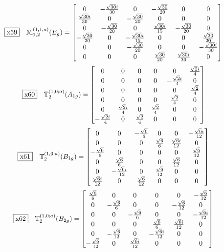 \documentclass[fleqn,10pt,landscape]{jsarticle}
\begin{document}
\begin{dmath*}
\fbox{x59}\quad \mathbb{M}_{1,2}^{(1,1;a)}(E_{g})=\begin{bmatrix} 0 & - \frac{\sqrt{30} i}{30} & 0 & - \frac{\sqrt{30}}{20} & 0 & 0 \\ \frac{\sqrt{30} i}{30} & 0 & - \frac{\sqrt{30}}{20} & 0 & 0 & 0 \\ 0 & - \frac{\sqrt{30}}{20} & 0 & \frac{\sqrt{30} i}{15} & - \frac{\sqrt{30}}{20} & 0 \\ - \frac{\sqrt{30}}{20} & 0 & - \frac{\sqrt{30} i}{15} & 0 & 0 & \frac{\sqrt{30}}{20} \\ 0 & 0 & - \frac{\sqrt{30}}{20} & 0 & 0 & - \frac{\sqrt{30} i}{30} \\ 0 & 0 & 0 & \frac{\sqrt{30}}{20} & \frac{\sqrt{30} i}{30} & 0 \end{bmatrix}
\end{dmath*}
\begin{dmath*}
\fbox{x60}\quad \mathbb{T}_{2}^{(1,0;a)}(A_{1g})=\begin{bmatrix} 0 & 0 & 0 & 0 & 0 & \frac{\sqrt{2} i}{4} \\ 0 & 0 & 0 & 0 & - \frac{\sqrt{2} i}{4} & 0 \\ 0 & 0 & 0 & 0 & 0 & \frac{\sqrt{2}}{4} \\ 0 & 0 & 0 & 0 & \frac{\sqrt{2}}{4} & 0 \\ 0 & \frac{\sqrt{2} i}{4} & 0 & \frac{\sqrt{2}}{4} & 0 & 0 \\ - \frac{\sqrt{2} i}{4} & 0 & \frac{\sqrt{2}}{4} & 0 & 0 & 0 \end{bmatrix}
\end{dmath*}
\begin{dmath*}
\fbox{x61}\quad \mathbb{T}_{2}^{(1,0;a)}(B_{1g})=\begin{bmatrix} 0 & 0 & - \frac{\sqrt{6}}{6} & 0 & 0 & - \frac{\sqrt{6} i}{12} \\ 0 & 0 & 0 & \frac{\sqrt{6}}{6} & \frac{\sqrt{6} i}{12} & 0 \\ - \frac{\sqrt{6}}{6} & 0 & 0 & 0 & 0 & \frac{\sqrt{6}}{12} \\ 0 & \frac{\sqrt{6}}{6} & 0 & 0 & \frac{\sqrt{6}}{12} & 0 \\ 0 & - \frac{\sqrt{6} i}{12} & 0 & \frac{\sqrt{6}}{12} & 0 & 0 \\ \frac{\sqrt{6} i}{12} & 0 & \frac{\sqrt{6}}{12} & 0 & 0 & 0 \end{bmatrix}
\end{dmath*}
\begin{dmath*}
\fbox{x62}\quad \mathbb{T}_{2}^{(1,0;a)}(B_{2g})=\begin{bmatrix} \frac{\sqrt{6}}{6} & 0 & 0 & 0 & 0 & - \frac{\sqrt{6}}{12} \\ 0 & - \frac{\sqrt{6}}{6} & 0 & 0 & - \frac{\sqrt{6}}{12} & 0 \\ 0 & 0 & - \frac{\sqrt{6}}{6} & 0 & 0 & - \frac{\sqrt{6} i}{12} \\ 0 & 0 & 0 & \frac{\sqrt{6}}{6} & \frac{\sqrt{6} i}{12} & 0 \\ 0 & - \frac{\sqrt{6}}{12} & 0 & - \frac{\sqrt{6} i}{12} & 0 & 0 \\ - \frac{\sqrt{6}}{12} & 0 & \frac{\sqrt{6} i}{12} & 0 & 0 & 0 \end{bmatrix}
\end{dmath*}
\end{document}
